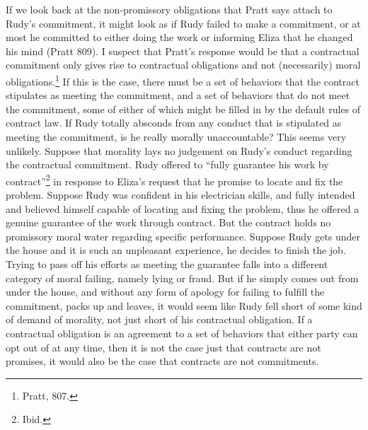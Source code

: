 If we look back at the non-promissory obligations that Pratt says attach
to Rudy's commitment, it might look as if Rudy failed to make a
commitment, or at most he committed to either doing the work or
informing Eliza that he changed his mind (Pratt 809). I suspect that
Pratt's response would be that a contractual commitment only gives rise
to contractual obligations and not (necessarily) moral
obligations.\footnote{Pratt, 807.} If this is the case, there must be a
set of behaviors that the contract stipulates as meeting the commitment,
and a set of behaviors that do not meet the commitment, some of either
of which might be filled in by the default rules of contract law. If
Rudy totally absconds from any conduct that is stipulated as meeting the
commitment, is he really morally unaccountable? This seems very
unlikely. Suppose that morality lays no judgement on Rudy's conduct
regarding the contractual commitment. Rudy offered to ``fully guarantee
his work by contract''\footnote{Ibid.} in response to Eliza's request
that he promise to locate and fix the problem. Suppose Rudy was
confident in his electrician skills, and fully intended and believed
himself capable of locating and fixing the problem, thus he offered a
genuine guarantee of the work through contract. But the contract holds
no promissory moral water regarding specific performance. Suppose Rudy
gets under the house and it is such an unpleasant experience, he decides
to finish the job. Trying to pass off his efforts as meeting the
guarantee falls into a different category of moral failing, namely lying
or fraud. But if he simply comes out from under the house, and without
any form of apology for failing to fulfill the commitment, packs up and
leaves, it would seem like Rudy fell short of some kind of demand of
morality, not just short of his contractual obligation. If a contractual
obligation is an agreement to a set of behaviors that either party can
opt out of at any time, then it is not the case just that contracts are
not promises, it would also be the case that contracts are not
commitments.

